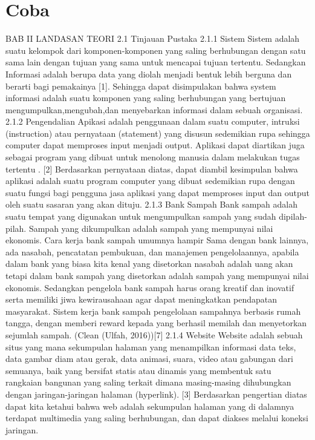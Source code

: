 \section{Coba}
BAB II
LANDASAN TEORI
2.1	Tinjauan Pustaka
2.1.1	Sistem
Sistem adalah suatu kelompok dari komponen-komponen yang saling berhubungan dengan satu sama lain dengan tujuan yang sama untuk mencapai tujuan tertentu. Sedangkan Informasi adalah berupa data yang diolah menjadi bentuk lebih berguna dan berarti bagi pemakainya [1]. Sehingga dapat disimpulakan bahwa system informasi adalah suatu komponen yang saling berhubungan yang bertujuan mengumpulkan,mengubah,dan menyebarkan informasi dalam sebuah organisasi.
2.1.2	Pengendalian
Apikasi adalah penggunaan dalam suatu computer, intruksi (instruction) atau pernyataan (statement) yang disusun sedemikian rupa sehingga computer dapat memproses input menjadi output. Aplikasi dapat diartikan juga sebagai program yang dibuat untuk menolong manusia dalam melakukan tugas tertentu . [2] 
Berdasarkan pernyataan diatas, dapat diambil kesimpulan bahwa aplikasi adalah suatu program computer yang dibuat sedemikian rupa dengan suatu fungsi bagi pengguna jasa aplikasi yang dapat memproses input dan output oleh suatu sasaran yang akan dituju.
2.1.3	Bank Sampah
Bank sampah adalah suatu tempat yang digunakan untuk mengumpulkan
sampah yang sudah dipilah-pilah. Sampah yang dikumpulkan adalah sampah
yang mempunyai nilai ekonomis. Cara kerja bank sampah umumnya hampir
Sama dengan bank lainnya, ada nasabah, pencatatan pembukuan, dan manajemen pengelolaannya, apabila dalam bank yang biasa kita kenal yang disetorkan nasabah adalah uang akan tetapi dalam bank sampah yang disetorkan adalah sampah yang mempunyai nilai ekonomis. Sedangkan pengelola bank sampah harus orang kreatif dan inovatif serta memiliki jiwa kewirausahaan agar dapat meningkatkan pendapatan masyarakat. Sistem kerja bank sampah pengelolaan sampahnya berbasis rumah tangga, dengan memberi reward kepada yang berhasil memilah dan menyetorkan sejumlah sampah. (Clean (Ulfah, 2016))[7]
2.1.4	Website
Website adalah sebuah situs yang mana sekumpulan halaman yang menampilkan informasi data teks, data gambar diam atau gerak, data animasi, suara, video atau gabungan dari semuanya, baik yang bersifat statis atau dinamis yang membentuk satu rangkaian bangunan yang saling terkait dimana masing-masing dihubungkan dengan jaringan-jaringan halaman (hyperlink). [3]
Berdasarkan pengertian diatas dapat kita ketahui bahwa web adalah sekumpulan halaman yang di dalamnya terdapat multimedia yang saling berhubungan, dan dapat diakses melalui koneksi jaringan.
